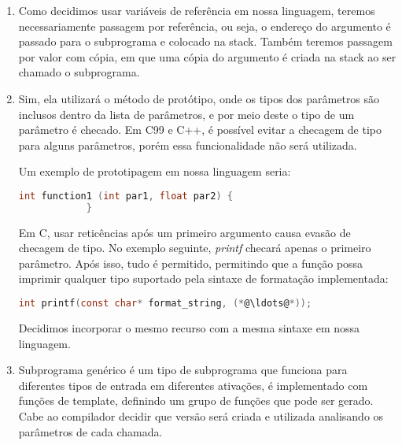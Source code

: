 \documentclass[12pt, a4paper]{article}
\begin{document}
\begin{enumerate}
        \begin{comment}
            Além disso, novamente, como o caráter dos subprogramas é simples,
            pode-se facilmente atribuir o valor de um subprograma a uma
            variável e então usar essa variável como argumento.
        \end{comment}

        \item
        Como decidimos usar variáveis de referência em nossa linguagem, teremos
        necessariamente passagem por referência, ou seja, o endereço do
        argumento é passado para o subprograma e colocado na stack. Também
        teremos passagem por valor com cópia, em que uma cópia do argumento é
        criada na stack ao ser chamado o subprograma.

        \item
        Sim, ela utilizará o método de protótipo, onde os tipos dos parâmetros
        são inclusos dentro da lista de parâmetros, e por meio deste o tipo de
        um parâmetro é checado. Em C99 e C++, é possível evitar a checagem de
        tipo para alguns parâmetros, porém essa funcionalidade não será
        utilizada.

        Um exemplo de prototipagem em nossa linguagem seria:
        \begin{lstlisting}[language=C]
            int function1 (int par1, float par2) {
            }
        \end{lstlisting}

        Em C, usar reticências após um primeiro argumento causa evasão de
        checagem de tipo. No exemplo seguinte, \emph{printf} checará apenas o
        primeiro parâmetro. Após isso, tudo é permitido, permitindo que a
        função possa imprimir qualquer tipo suportado pela sintaxe de
        formatação implementada:
        \begin{lstlisting}[language=C]
        int printf(const char* format_string, (*@\ldots@*));
        \end{lstlisting}

        Decidimos incorporar o mesmo recurso com a mesma sintaxe em nossa
        linguagem.

        \item
        Subprograma genérico é um tipo de subprograma que funciona para
        diferentes tipos de entrada em diferentes ativações, é implementado com
        funções de template, definindo um grupo de funções que pode ser gerado.
        Cabe ao compilador decidir que versão será criada e utilizada
        analisando os parâmetros de cada chamada.


\end{enumerate}
\end{document}
